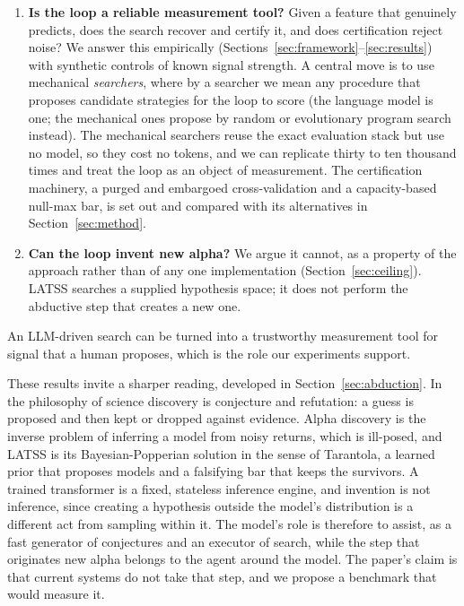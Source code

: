 \documentclass[11pt]{article}
\begin{document}
\begin{enumerate}[leftmargin=1.4em]
\item \textbf{Is the loop a reliable measurement tool?} Given a feature that genuinely predicts, does the
search recover and certify it, and does certification reject noise? We answer this empirically
(Sections~\ref{sec:framework}--\ref{sec:results}) with synthetic controls of known signal strength.
A central move is to use mechanical \emph{searchers}, where by a searcher we mean any procedure that
proposes candidate strategies for the loop to score (the language model is one; the mechanical ones
propose by random or evolutionary program search instead). The mechanical searchers reuse the exact
evaluation stack but use no model, so they cost no tokens, and we can replicate thirty to ten thousand
times and treat the loop as an object of measurement. The certification machinery, a purged and embargoed cross-validation and a
capacity-based null-max bar, is set out and compared with its alternatives in
Section~\ref{sec:method}.
\item \textbf{Can the loop invent new alpha?} We argue it cannot, as a property of the approach
rather than of any one implementation (Section~\ref{sec:ceiling}). LATSS searches a supplied
hypothesis space; it does not perform the abductive step that creates a new one.
\end{enumerate}

An LLM-driven search can be turned into a trustworthy measurement tool for
signal that a human proposes, which is the role our experiments support.

These results invite a sharper reading, developed in Section~\ref{sec:abduction}. In the philosophy of
science discovery is conjecture and refutation: a guess is proposed and then kept or dropped against
evidence. Alpha discovery is the inverse problem of inferring a model from noisy returns, which is
ill-posed, and LATSS is its Bayesian-Popperian solution in the sense of Tarantola, a learned prior that
proposes models and a falsifying bar that keeps the survivors. A
trained transformer is a fixed, stateless inference engine, and invention is not inference, since
creating a hypothesis outside the model's distribution is a different act from sampling within it. The
model's role is therefore to assist, as a fast generator of conjectures and an executor of search, while
the step that originates new alpha belongs to the agent around the model. The paper's claim is that
current systems do not take that step, and we propose a benchmark that would measure it.
\end{document}
